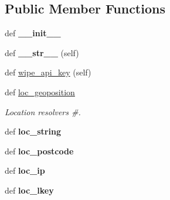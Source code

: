 \subsection*{Public Member Functions}
\begin{DoxyCompactItemize}
\item 
\hypertarget{classpyccuweather_1_1connector_1_1_connection_a60b22d30224f352fb9125d258e83b82e}{}def {\bfseries \+\_\+\+\_\+init\+\_\+\+\_\+}\label{classpyccuweather_1_1connector_1_1_connection_a60b22d30224f352fb9125d258e83b82e}

\item 
\hypertarget{classpyccuweather_1_1connector_1_1_connection_afaa2776cf727065892230a1c65eb1c40}{}def {\bfseries \+\_\+\+\_\+str\+\_\+\+\_\+} (self)\label{classpyccuweather_1_1connector_1_1_connection_afaa2776cf727065892230a1c65eb1c40}

\item 
def \hyperlink{classpyccuweather_1_1connector_1_1_connection_afe5070f82e2ec598245b450a8c3e5b5e}{wipe\+\_\+api\+\_\+key} (self)
\item 
\hypertarget{classpyccuweather_1_1connector_1_1_connection_a3f389b4627b756a7d84f6840b71be8ad}{}def \hyperlink{classpyccuweather_1_1connector_1_1_connection_a3f389b4627b756a7d84f6840b71be8ad}{loc\+\_\+geoposition}\label{classpyccuweather_1_1connector_1_1_connection_a3f389b4627b756a7d84f6840b71be8ad}

\begin{DoxyCompactList}\small\item\em Location resolvers \#. \end{DoxyCompactList}\item 
\hypertarget{classpyccuweather_1_1connector_1_1_connection_a66e6990a0f54f43f7dea2d46beb6c070}{}def {\bfseries loc\+\_\+string}\label{classpyccuweather_1_1connector_1_1_connection_a66e6990a0f54f43f7dea2d46beb6c070}

\item 
\hypertarget{classpyccuweather_1_1connector_1_1_connection_aabac939e533b0881a8bf9534e70a57c4}{}def {\bfseries loc\+\_\+postcode}\label{classpyccuweather_1_1connector_1_1_connection_aabac939e533b0881a8bf9534e70a57c4}

\item 
\hypertarget{classpyccuweather_1_1connector_1_1_connection_aa60476694404266e2670be7569a2c40b}{}def {\bfseries loc\+\_\+ip}\label{classpyccuweather_1_1connector_1_1_connection_aa60476694404266e2670be7569a2c40b}

\item 
\hypertarget{classpyccuweather_1_1connector_1_1_connection_ae9321e2e564f7fc3ec74a6e543df8a33}{}def {\bfseries loc\+\_\+lkey}\label{classpyccuweather_1_1connector_1_1_connection_ae9321e2e564f7fc3ec74a6e543df8a33}


\end{DoxyCompactItemize}
